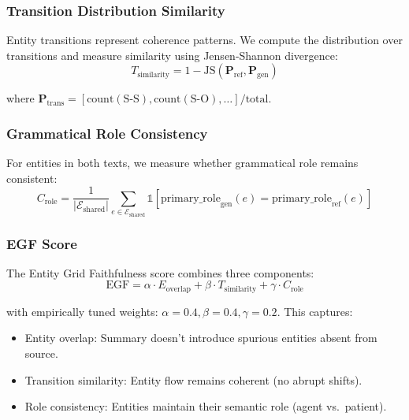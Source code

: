 \documentclass[11pt,a4paper]{article}
\begin{document}
\subsubsection{Transition Distribution Similarity}

Entity transitions represent coherence patterns. We compute the distribution over transitions and measure similarity using Jensen-Shannon divergence:
\begin{equation}
T_{\text{similarity}} = 1 - \text{JS}(\mathbf{P}_{\text{ref}}, \mathbf{P}_{\text{gen}})
\end{equation}

where $\mathbf{P}_{\text{trans}} = [\text{count}(\text{S-S}), \text{count}(\text{S-O}), \ldots] / \text{total}$.

\subsubsection{Grammatical Role Consistency}

For entities in both texts, we measure whether grammatical role remains consistent:
\begin{equation}
C_{\text{role}} = \frac{1}{|\mathcal{E}_{\text{shared}}|} \sum_{e \in \mathcal{E}_{\text{shared}}} \mathbb{1}[\text{primary\_role}_{\text{gen}}(e) = \text{primary\_role}_{\text{ref}}(e)]
\end{equation}

\subsubsection{EGF Score}

The Entity Grid Faithfulness score combines three components:
\begin{equation}
\text{EGF} = \alpha \cdot E_{\text{overlap}} + \beta \cdot T_{\text{similarity}} + \gamma \cdot C_{\text{role}}
\end{equation}

with empirically tuned weights: $\alpha = 0.4, \beta = 0.4, \gamma = 0.2$. This captures:
\begin{itemize}
\item Entity overlap: Summary doesn't introduce spurious entities absent from source.
\item Transition similarity: Entity flow remains coherent (no abrupt shifts).
\item Role consistency: Entities maintain their semantic role (agent vs.\ patient).
\end{itemize}
\end{document}
